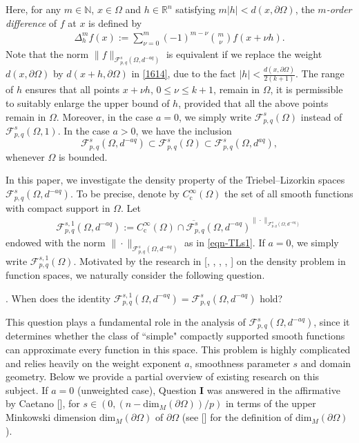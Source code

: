 \documentclass[11pt,twoside]{article}
\def\rn{{\mathbb{R}^n}}
\def\nn{{\mathbb N}}
\def\fz{\infty }
\def\boz{{\Omega}}
\def\pa{\partial}                %
\theoremstyle{mylem}
\theoremstyle{definition}
\numberwithin{equation}{section}
\begin{document}
Here, for any $m\in\nn$,  $x\in \Omega$ and $h\in \rn$  satisfying $m|h|<d(x,\pa\boz)$, 
the \emph{$m$-order difference} of $f$ at $x$ is defined by
\begin{align*}
\Delta_h^m f(x)
:=\sum_{\nu=0}^m (-1)^{m-\nu}\binom{m}{\nu}f(x+\nu h).
\end{align*}
Note that the norm 
$\|f\|_{\mathcal F_{p,q}^s(\boz,d^{-aq})}$ is equivalent if we replace
the weight $d(x,\partial \Omega)$ by $d(x+h,\partial \Omega)$ in \eqref{1614}, due to the fact 
$|h|<\frac{d(x,\pa\boz)}{2(k+1)}$.
The range of \(h\) ensures that all points $x+\nu h$, $0\leq\nu\leq k+1$, remain in $\Omega$, it is permissible to suitably enlarge the upper bound of \(h\), provided that all the above points remain in \(\Omega\).
Moreover, in the case  $a=0$, we simply write $\mathcal F_{p,q}^s(\Omega)$ 
instead of $\mathcal F_{p,q}^s(\Omega,1)$. In the case
$a>0$, we have the inclusion
$$\mathcal{F}_{p, q}^{s}(\boz,d^{-aq})\subset\mathcal F_{p,q}^s(\Omega)
\subset \mathcal{F}_{p, q}^{s}(\boz,d^{aq}),$$ whenever $\boz$ is bounded.


In this paper, we investigate the density property of the Triebel--Lizorkin
spaces $\mathcal{F}_{p,q}^{s}(\boz,d^{-aq})$. To be precise, 
denote by $C_{\mathrm{c}}^{\fz}(\boz)$ the set of all smooth functions with compact support in 
$\boz$.
Let 
\begin{align}\label{eqn-1.4}
\mathcal F_{p,q}^{s,1}(\boz,d^{-aq}):=\overline{C_{\mathrm{c}}^{\fz}(\boz)\cap \mathcal F_{p, q}^{s}(\boz,d^{-aq})}^{\|\cdot\|_{\mathcal F_{p,q}^s(\boz,d^{-aq})}}
\end{align}
endowed with the norm
$\|\cdot\|_{\mathcal F_{p,q}^s(\Omega,d^{-aq})}$ as in \eqref{eqn-TLs1}. 
If $a=0$,  we simply write ${\mathcal F}_{p,q}^{s,1}(\boz)$. Motivated by the research in [\cite{c2000}, \cite{cjlz2022}, \cite{dk2021}, \cite{dk2022}, \cite{k2023}] on the density problem in function spaces, we naturally consider the following question.

\medskip 

{. When does the identity $\mathcal F_{p,q}^{s,1}(\boz,d^{-aq})=\mathcal F_{p,q}^{s}(\boz,d^{-aq})$ hold?}

\medskip
This question plays a fundamental role in the analysis of $\mathcal F_{p, q}^{s}(\boz,d^{-aq})$, since 
it determines whether the class of  ``simple" compactly supported smooth functions can approximate
every function in this space.  This problem is highly complicated and relies heavily on the weight exponent $a$, 
smoothness parameter $s$ and domain geometry. 
Below we provide a partial overview of existing research on this subject.
If $a=0$ (unweighted case),  Question {\bf I} was answered in the affirmative  by Caetano [\cite{c2000}], 
for $s\in (0,{(n-\mathrm{dim}_M(\partial\Omega))}/{p})$ in terms of the upper Minkowski dimension $\mathrm{dim}_M(\partial\Omega)$
of $\partial \Omega$ (see [\cite{klv2013}] for the definition of $\mathrm{dim}_M(\partial\Omega)$).
\end{document}
